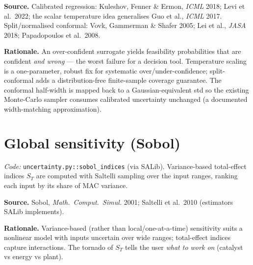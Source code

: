 \documentclass[11pt,a4paper]{article}
\begin{document}
\textbf{Source.} Calibrated regression: Kuleshov, Fenner \& Ermon, \emph{ICML}
2018; Levi et al.\ 2022; the scalar temperature idea generalises Guo et al.,
\emph{ICML} 2017. Split/normalised conformal: Vovk, Gammerman \& Shafer 2005; Lei
et al., \emph{JASA} 2018; Papadopoulos et al.\ 2008.

\textbf{Rationale.} An over-confident surrogate yields feasibility probabilities
that are confident \emph{and wrong} --- the worst failure for a decision tool.
Temperature scaling is a one-parameter, robust fix for systematic
over/under-confidence; split-conformal adds a distribution-free finite-sample
coverage guarantee. The conformal half-width is mapped back to a
Gaussian-equivalent std so the existing Monte-Carlo sampler consumes calibrated
uncertainty unchanged (a documented width-matching approximation).

\section{Global sensitivity (Sobol)}
\emph{Code: }\texttt{uncertainty.py::sobol\_indices} (via SALib). Variance-based
total-effect indices $S_T$ are computed with Saltelli sampling over the input
ranges, ranking each input by its share of MAC variance.

\textbf{Source.} Sobol, \emph{Math.\ Comput.\ Simul.} 2001; Saltelli et al.\ 2010
(estimators SALib implements).

\textbf{Rationale.} Variance-based (rather than local/one-at-a-time) sensitivity
suits a nonlinear model with inputs uncertain over wide ranges; total-effect
indices capture interactions. The tornado of $S_T$ tells the user \emph{what to
work on} (catalyst vs energy vs plant).
\end{document}
